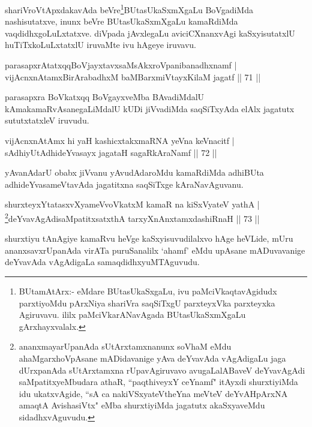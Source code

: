 \begin{artha}
shariVroVtApxdakavAda beVre\footnote{BUtamAtArx:- eMdare BUtasUkaSxgaLu, ivu paMciVkaqtavAgidudx parxtiyoMdu pArxNiya shariVra saqSiTxgU parxteyxVka parxteyxka Agiruvavu. ililx  paMciVkarANavAgada BUtasUkaSxmXgaLu gArxhayxvalalx.}BUtasUkaSxmXgaLu BoVgadiMda nashisutatxve, inunx beVre BUtasUkaSxmXgaLu kamaRdiMda vaqdidhxgoLuLxtatxve. diVpada jAvxlegaLu aviciCXnanxvAgi kaSxyisutatxlU huTiTxkoLuLxtatxlU iruvaMte ivu hAgeye iruvavu.
\end{artha}

\begin{shl}
parasapxrAtatxqqBoVjayxtavxsaMsAkxroVpanibanadhxnamf |\\
vijAcnxnAtamxBirArabadhxM baMBarxmiVtayxKilaM jagatf \hfill || 71 ||
\end{shl}

\begin{artha}
parasapxra BoVkatxqq BoVgayxveMba BAvadiMdalU kAmakamaRvAsanegaLiMdalU kUDi jiVvadiMda saqSiTxyAda elAlx jagatutx sututxtatxleV iruvudu.
\end{artha}


\begin{shl}
vijAcnxnAtAmx hi yaH kashicxtakxmaRNA yeVna keVnacitf |\\
sAdhiyUtAdhideYvasayx jagataH sagaRkAraNamf \hfill || 72 ||
\end{shl}

\begin{artha}
yAvanAdarU obabx jiVvanu yAvudAdaroMdu kamaRdiMda adhiBUta adhideYvasameVtavAda jagatitxna saqSiTxge kAraNavAguvanu.
\end{artha}
 
\begin{shl}
shurxteyxYtatasxvXyameVvoVkatxM kamaR na kiSxVyateV yathA |\\
\footnote{ananxmayarUpanAda sUtArxtamxnanunx soV\s haM eMdu ahaMgarxhoVpAsane mADidavanige yAva deYvavAda vAgAdigaLu jaga dUrxpanAda sUtArxtamxna rUpavAgiruvavo avugaLalABaveV deYvavAgAdi saMpatitxyeMbudara athaR, ``paqthiveyxY ceYnamf" itAyxdi shurxtiyiMda idu ukatxvAgide, ``sA ca nakiVSxyateV\s theYna meVteV deYvAHpArxNA amaqtA AvishasiVtx" eMba shurxtiyiMda jagatutx akaSxyaveMdu sidadhxvAguvudu.}deYvavAgAdisaMpatitxsatxthA tarxyXnAnxtamxdashiRnaH \hfill || 73 ||
\end{shl}

\begin{artha}
shurxtiyu tAnAgiye kamaRvu heVge kaSxyisuvudilalxvo hAge heVLide, mUru ananxsavxrUpanAda virATa puruSanalilx `ahamf' eMdu upAsane mADuvavanige deYvavAda vAgAdigaLa samaqdidhxyuMTAguvudu.
\end{artha}

